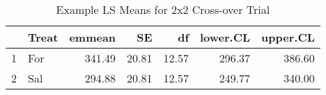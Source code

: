 \begin{table}[ht]
\centering
\begin{tabular}{rlrrrrr}
  \hline
 & Treat & emmean & SE & df & lower.CL & upper.CL \\ 
  \hline
1 & For & 341.49 & 20.81 & 12.57 & 296.37 & 386.60 \\ 
  2 & Sal & 294.88 & 20.81 & 12.57 & 249.77 & 340.00 \\ 
   \hline
\end{tabular}
\caption{Example LS Means for 2x2 Cross-over Trial} 
\label{lsMeansTable}
\end{table}

